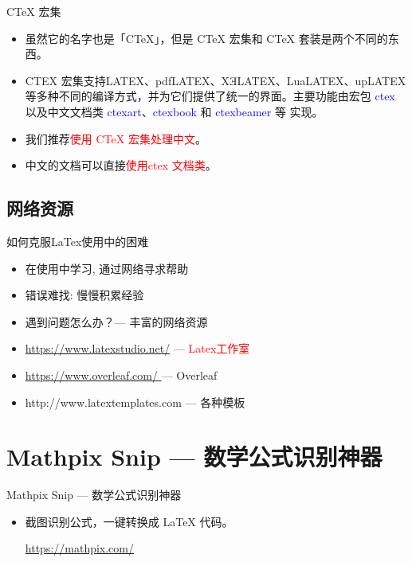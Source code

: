 \documentclass[13pt]{ctexbeamer}
\newcommand{\red}[1]{\textcolor{red}{#1}}
\newcommand{\blue}[1]{\textcolor{blue}{#1}}
\begin{document}
\begin{frame}{CTeX 宏集}
	\begin{itemize}
		\item 
		虽然它的名字也是「CTeX」，但是 CTeX 宏集和 CTeX 套装是两个不同的东西。
		\item  CTEX 宏集支持LATEX、pdfLATEX、XƎLATEX、LuaLATEX、upLATEX 等多种不同的编译方式，并为它们提供了统一的界面。主要功能由宏包  \blue{ctex} 以及中文文档类  \blue{ctexart}、\blue{ctexbook} 和  \blue{ctexbeamer}  等 实现。
		\item 我们推荐\red{使用 CTeX 宏集处理中文}。
		\item 中文的文档可以直接\red{使用ctex 文档类}。
	\end{itemize}
	
	
\end{frame}



\subsection{网络资源}




\begin{frame}{如何克服LaTex使用中的困难}
	\begin{itemize}
\item 	  在使用中学习, 通过网络寻求帮助

\item 	  错误难找: 慢慢积累经验

\item 	  遇到问题怎么办？---  丰富的网络资源

	\end{itemize}

	
\begin{itemize}
    \item 
   \blue{ \href{https://www.latexstudio.net/}{https://www.latexstudio.net/} }   ---     \red{Latex工作室}  
    \item 
    \href{https://www.overleaf.com/
}{https://www.overleaf.com/
}   ---  Overleaf  
\item 
http://www.latextemplates.com --- 各种模板

\end{itemize}
\end{frame} 
  

\section{Mathpix Snip --- 数学公式识别神器}
\begin{frame}{Mathpix Snip --- 数学公式识别神器}
\begin{itemize}
	\item 截图识别公式，一键转换成 LaTeX 代码。
	
\href{https://mathpix.com/}{https://mathpix.com/}
\end{itemize}
\end{frame} 
\end{document}
